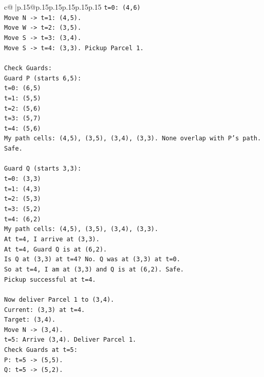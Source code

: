 \documentclass{article}
\begin{document}
{\begin{supertabular}{c@{$\;$}|p{.15\linewidth}@{}p{.15\linewidth}p{.15\linewidth}p{.15\linewidth}p{.15\linewidth}p{.15\linewidth}}
{{{\texttt{t=0: (4,6)} \\
\texttt{Move N {-}> t=1: (4,5).} \\
\texttt{Move W {-}> t=2: (3,5).} \\
\texttt{Move S {-}> t=3: (3,4).} \\
\texttt{Move S {-}> t=4: (3,3). Pickup Parcel 1.} \\
\\ 
\texttt{Check Guards:} \\
\texttt{Guard P (starts 6,5):} \\
\texttt{t=0: (6,5)} \\
\texttt{t=1: (5,5)} \\
\texttt{t=2: (5,6)} \\
\texttt{t=3: (5,7)} \\
\texttt{t=4: (5,6)} \\
\texttt{My path cells: (4,5), (3,5), (3,4), (3,3). None overlap with P's path. Safe.} \\
\\ 
\texttt{Guard Q (starts 3,3):} \\
\texttt{t=0: (3,3)} \\
\texttt{t=1: (4,3)} \\
\texttt{t=2: (5,3)} \\
\texttt{t=3: (5,2)} \\
\texttt{t=4: (6,2)} \\
\texttt{My path cells: (4,5), (3,5), (3,4), (3,3).} \\
\texttt{At t=4, I arrive at (3,3).} \\
\texttt{At t=4, Guard Q is at (6,2).} \\
\texttt{Is Q at (3,3) at t=4? No. Q was at (3,3) at t=0.} \\
\texttt{So at t=4, I am at (3,3) and Q is at (6,2). Safe.} \\
\texttt{Pickup successful at t=4.} \\
\\ 
\texttt{Now deliver Parcel 1 to (3,4).} \\
\texttt{Current: (3,3) at t=4.} \\
\texttt{Target: (3,4).} \\
\texttt{Move N {-}> (3,4).} \\
\texttt{t=5: Arrive (3,4). Deliver Parcel 1.} \\
\texttt{Check Guards at t=5:} \\
\texttt{P: t=5 {-}> (5,5).} \\
\texttt{Q: t=5 {-}> (5,2).} \\
}}}
\end{supertabular}}
\end{document}
